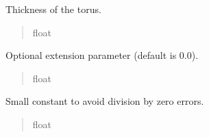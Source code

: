 \documentclass[letterpaper,10pt,english]{sphinxmanual}
\begin{document}
\begin{fulllineitems}
\begin{fulllineitems}
\begin{quote}
\begin{description}
\end{description}\end{quote}

\end{fulllineitems}


\begin{fulllineitems}
\label{\detokenize{src:src.Torus.Torus.thickness}}
\pysigstartsignatures
{}
\pysigstopsignatures
\sphinxAtStartPar
Thickness of the torus.
\begin{quote}\begin{description}
\sphinxAtStartPar
float

\end{description}\end{quote}

\end{fulllineitems}


\begin{fulllineitems}
\label{\detokenize{src:src.Torus.Torus.extension}}
\pysigstartsignatures
{}
\pysigstopsignatures
\sphinxAtStartPar
Optional extension parameter (default is 0.0).
\begin{quote}\begin{description}
\sphinxAtStartPar
float

\end{description}\end{quote}

\end{fulllineitems}


\begin{fulllineitems}
\label{\detokenize{src:src.Torus.Torus.eps}}
\pysigstartsignatures
{}
\pysigstopsignatures
\sphinxAtStartPar
Small constant to avoid division by zero errors.
\begin{quote}\begin{description}
\sphinxAtStartPar
float


\end{description}
\end{quote}
\end{fulllineitems}
\end{fulllineitems}
\end{document}
